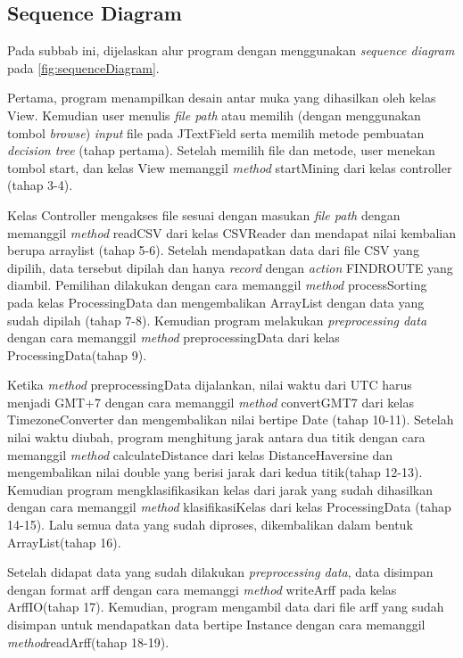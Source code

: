 \subsection{Sequence Diagram}

Pada subbab ini, dijelaskan alur program dengan menggunakan \textsl{sequence diagram} pada \ref{fig:sequenceDiagram}.

Pertama, program menampilkan desain antar muka yang dihasilkan oleh kelas View. Kemudian user menulis \textsl{file path} atau memilih (dengan menggunakan tombol \textsl{browse}) \textsl{input} file pada JTextField serta memilih metode pembuatan \textsl{decision tree} (tahap  pertama). Setelah memilih file dan metode, user menekan tombol start, dan kelas View memanggil \textsl{method} startMining dari kelas controller (tahap 3-4).

Kelas Controller mengakses file sesuai dengan masukan \textsl{file path} dengan memanggil \textsl{method} readCSV dari kelas CSVReader dan mendapat nilai kembalian berupa arraylist (tahap 5-6). Setelah mendapatkan data dari file CSV yang dipilih, data tersebut dipilah dan hanya \textsl{record} dengan \textsl{action} FINDROUTE yang diambil. Pemilihan dilakukan dengan cara memanggil \textsl{method} processSorting pada kelas ProcessingData dan mengembalikan ArrayList dengan data yang sudah dipilah (tahap 7-8). Kemudian program melakukan \textsl{preprocessing data} dengan cara memanggil \textsl{method} preprocessingData dari kelas ProcessingData(tahap 9).

Ketika \textsl{method} preprocessingData dijalankan, nilai waktu dari UTC harus menjadi GMT+7 dengan cara memanggil \textsl{method} convertGMT7 dari kelas TimezoneConverter dan mengembalikan nilai bertipe Date (tahap 10-11). Setelah nilai waktu diubah, program menghitung jarak antara dua titik dengan cara memanggil \textsl{method} calculateDistance  dari kelas DistanceHaversine dan mengembalikan nilai double yang berisi jarak dari kedua titik(tahap 12-13). Kemudian program mengklasifikasikan kelas dari jarak yang sudah dihasilkan dengan cara memanggil \textsl{method} klasifikasiKelas dari kelas ProcessingData (tahap 14-15). Lalu semua data yang sudah diproses, dikembalikan dalam bentuk ArrayList(tahap 16).

Setelah didapat data yang sudah dilakukan \textsl{preprocessing data}, data disimpan dengan format arff dengan cara memanggi \textsl{method} writeArff pada kelas ArffIO(tahap 17). Kemudian, program mengambil data dari file arff yang sudah disimpan untuk mendapatkan data bertipe Instance dengan cara memanggil \textsl{method}readArff(tahap 18-19).

